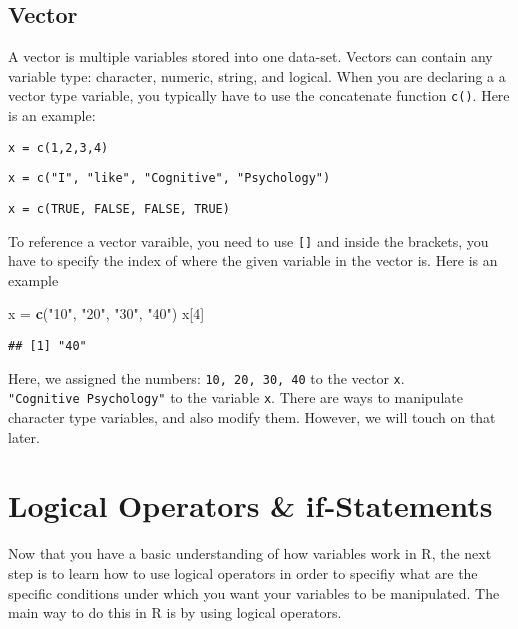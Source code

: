 \documentclass[
]{book}
\newenvironment{Shaded}{\begin{snugshade}}{\end{snugshade}}
\newcommand{\DecValTok}[1]{\textcolor[rgb]{0.00,0.00,0.81}{#1}}
\newcommand{\KeywordTok}[1]{\textcolor[rgb]{0.13,0.29,0.53}{\textbf{#1}}}
\newcommand{\NormalTok}[1]{#1}
\newcommand{\StringTok}[1]{\textcolor[rgb]{0.31,0.60,0.02}{#1}}
\begin{document}
\hypertarget{vector}{%
\subsection{Vector}\label{vector}}

A vector is multiple variables stored into one data-set. Vectors can contain any variable type: character, numeric, string, and logical. When you are declaring a a vector type variable, you typically have to use the concatenate function \texttt{c()}. Here is an example:

\texttt{x\ =\ c(1,2,3,4)}

\texttt{x\ =\ c("I",\ "like",\ "Cognitive",\ "Psychology")}

\texttt{x\ =\ c(TRUE,\ FALSE,\ FALSE,\ TRUE)}

To reference a vector varaible, you need to use \texttt{{[}{]}} and inside the brackets, you have to specify the index of where the given variable in the vector is. Here is an example

\begin{Shaded}
\begin{Highlighting}[]
\NormalTok{x =}\StringTok{ }\KeywordTok{c}\NormalTok{(}\StringTok{"10"}\NormalTok{, }\StringTok{"20"}\NormalTok{, }\StringTok{"30"}\NormalTok{, }\StringTok{"40"}\NormalTok{)}
\NormalTok{x[}\DecValTok{4}\NormalTok{]}
\end{Highlighting}
\end{Shaded}

\begin{verbatim}
## [1] "40"
\end{verbatim}

Here, we assigned the numbers: \texttt{10,\ 20,\ 30,\ 40} to the vector \texttt{x}. \texttt{"Cognitive\ Psychology"} to the variable \texttt{x}. There are ways to manipulate character type variables, and also modify them. However, we will touch on that later.

\hypertarget{logical-operators-if-statements}{%
\section{Logical Operators \& if-Statements}\label{logical-operators-if-statements}}

Now that you have a basic understanding of how variables work in R, the next step is to learn how to use logical operators in order to specifiy what are the specific conditions under which you want your variables to be manipulated. The main way to do this in R is by using logical operators.
\end{document}
